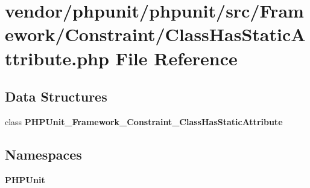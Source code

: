 \section{vendor/phpunit/phpunit/src/\+Framework/\+Constraint/\+Class\+Has\+Static\+Attribute.php File Reference}
\label{_class_has_static_attribute_8php}
\subsection*{Data Structures}
\begin{DoxyCompactItemize}
\item 
class {\bf P\+H\+P\+Unit\+\_\+\+Framework\+\_\+\+Constraint\+\_\+\+Class\+Has\+Static\+Attribute}
\end{DoxyCompactItemize}
\subsection*{Namespaces}
\begin{DoxyCompactItemize}
\item 
 {\bf P\+H\+P\+Unit}
\end{DoxyCompactItemize}

